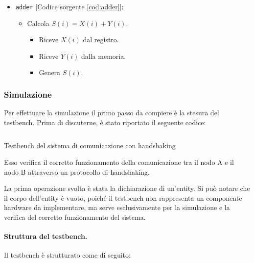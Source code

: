 \begin{itemize}
\begin{itemize}
    \end{itemize}
    \item \texttt{adder} [Codice sorgente \ref{cod:adder}]:
    \begin{itemize}
        \item Calcola $S(i) = X(i) + Y(i)$.
        \begin{itemize}
            \item Riceve $X(i)$ dal registro.
            \item Riceve $Y(i)$ dalla memoria.
            \item Genera $S(i)$.
        \end{itemize}
    \end{itemize}
\end{itemize}

\subsubsection{Simulazione}
Per effettuare la simulazione il primo passo da compiere è la stesura del testbench. Prima di discuterne, è stato riportato il seguente codice:

\begin{code}
    \inputminted{vhdl}{vhdl/handshaking_tb.vhd}
    \caption{Testbench del sistema di comunicazione con handshaking}
    \label{cod:handshaking_tb}
\end{code}

Esso verifica il corretto funzionamento della comunicazione tra il nodo A e il nodo B attraverso un protocollo di handshaking.

La prima operazione svolta è stata la dichiarazione di un’entity. Si può notare che il corpo dell’entity è vuoto, poiché il testbench non rappresenta un componente hardware da implementare, ma serve esclusivamente per la simulazione e la verifica del corretto funzionamento del sistema.

\paragraph{Struttura del testbench.}
Il testbench è strutturato come di seguito:


